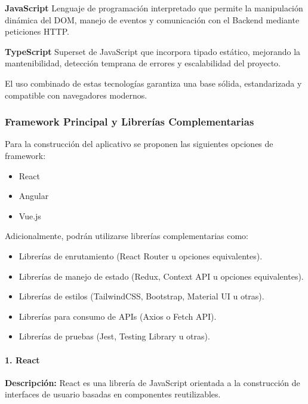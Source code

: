 \documentclass[12pt]{article}
\begin{document}
\textbf{JavaScript}  
Lenguaje de programación interpretado que permite la manipulación dinámica del DOM, manejo de eventos y comunicación con el Backend mediante peticiones HTTP.

\textbf{TypeScript}  
Superset de JavaScript que incorpora tipado estático, mejorando la mantenibilidad, detección temprana de errores y escalabilidad del proyecto.

El uso combinado de estas tecnologías garantiza una base sólida, estandarizada y compatible con navegadores modernos.

\subsubsection{Framework Principal y Librerías Complementarias}

Para la construcción del aplicativo se proponen las siguientes opciones de framework:

\begin{itemize}
    \item React
    \item Angular
    \item Vue.js
\end{itemize}

Adicionalmente, podrán utilizarse librerías complementarias como:

\begin{itemize}
    \item Librerías de enrutamiento (React Router u opciones equivalentes).
    \item Librerías de manejo de estado (Redux, Context API u opciones equivalentes).
    \item Librerías de estilos (TailwindCSS, Bootstrap, Material UI u otras).
    \item Librerías para consumo de APIs (Axios o Fetch API).
    \item Librerías de pruebas (Jest, Testing Library u otras).
\end{itemize}

\paragraph{1. React}

\textbf{Descripción:}  
React es una librería de JavaScript orientada a la construcción de interfaces de usuario basadas en componentes reutilizables.
\end{document}
